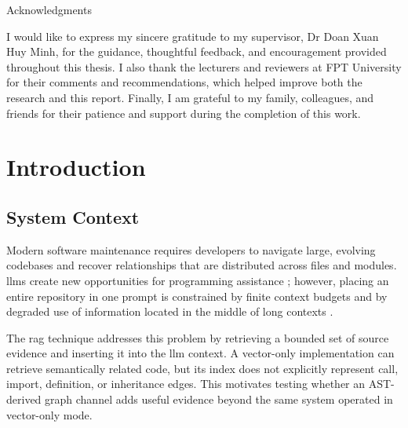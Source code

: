 \documentclass[12pt,letterpaper,oneside]{report}
\makeatletter
\newcommand{\thesislistoftables}{%
    \begingroup
    \renewcommand*\l@table{\@dottedtocline{1}{0em}{5em}}%
    \renewcommand{\numberline}[1]{\hb@xt@\@tempdima{\tablename~##1.\hfil}}%
    \listoftables
    \endgroup
}
\newcommand{\thesislistoffigures}{%
    \begingroup
    \renewcommand*\l@figure{\@dottedtocline{1}{0em}{5em}}%
    \renewcommand{\numberline}[1]{\hb@xt@\@tempdima{\figurename~##1.\hfil}}%
    \listoffigures
    \endgroup
}
\renewcommand{\headrulewidth}{0pt}
\renewcommand{\headrulewidth}{0pt}
\newenvironment{physicalcenter}{%
    \par\noindent\hspace*{-18pt}\begin{minipage}[t]{\textwidth}\centering
}{%
    \end{minipage}\par
}
\newcommand{\frontmatterheading}[1]{%
    \begin{physicalcenter}
        {\sffamily\fontsize{16}{19.2}\selectfont #1\par}
    \end{physicalcenter}
    \vspace{12pt}
}
\makeatother
\begin{document}
\clearpage
\thispagestyle{empty}
\frontmatterheading{Acknowledgments}
{}
I would like to express my sincere gratitude to my supervisor, Dr Doan Xuan Huy Minh, for the guidance, thoughtful feedback, and encouragement provided throughout this thesis. I also thank the lecturers and reviewers at FPT University for their comments and recommendations, which helped improve both the research and this report. Finally, I am grateful to my family, colleagues, and friends for their patience and support during the completion of this work.

\clearpage
{}
{}
\tableofcontents
\thispagestyle{empty}
\clearpage
{}
{}
\thesislistoftables
\thispagestyle{empty}
\clearpage
{}
{}
\thesislistoffigures
\thispagestyle{empty}
\clearpage
\printnoidxglossary[type=\acronymtype, title=List of Abbreviations]
\thispagestyle{empty}

\clearpage
{}
\pagestyle{thesismain}
\fancypagestyle{plain}{%
    \fancyhf{}
    \fancyhead[R]{\thepage}
    \renewcommand{\headrulewidth}{0pt}
}

\chapter{Introduction}

\section{System Context}
Modern software maintenance requires developers to navigate large, evolving codebases and recover relationships that are distributed across files and modules. \glspl{llm} create new opportunities for programming assistance \cite{chen2021codex}; however, placing an entire repository in one prompt is constrained by finite context budgets and by degraded use of information located in the middle of long contexts \cite{liu2023lost}.

The \gls{rag} technique \cite{lewis2020rag} addresses this problem by retrieving a bounded set of source evidence and inserting it into the \gls{llm} context. A vector-only implementation can retrieve semantically related code, but its index does not explicitly represent call, import, definition, or inheritance edges. This motivates testing whether an AST-derived graph channel adds useful evidence beyond the same system operated in vector-only mode.
\end{document}
